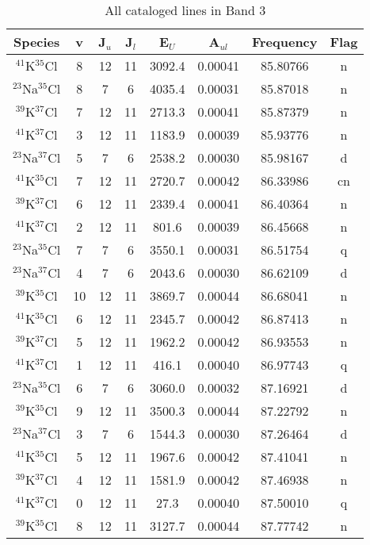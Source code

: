 \begin{table*}[htp]
\centering
\caption{All cataloged lines in Band 3}
\begin{tabular}{cccccccc}
\label{tab:all_detections_B3}
Species & v & J$_u$ & J$_l$ & E$_U$ & A$_{ul}$ & Frequency & Flag \\
\hline
$^{41}$K$^{35}$Cl & 8 & 12 & 11 & 3092.4 & 0.00041 & 85.80766 & n \\
$^{23}$Na$^{35}$Cl & 8 & 7 & 6 & 4035.4 & 0.00031 & 85.87018 & n \\
$^{39}$K$^{37}$Cl & 7 & 12 & 11 & 2713.3 & 0.00041 & 85.87379 & n \\
$^{41}$K$^{37}$Cl & 3 & 12 & 11 & 1183.9 & 0.00039 & 85.93776 & n \\
$^{23}$Na$^{37}$Cl & 5 & 7 & 6 & 2538.2 & 0.00030 & 85.98167 & d \\
$^{41}$K$^{35}$Cl & 7 & 12 & 11 & 2720.7 & 0.00042 & 86.33986 & cn \\
$^{39}$K$^{37}$Cl & 6 & 12 & 11 & 2339.4 & 0.00041 & 86.40364 & n \\
$^{41}$K$^{37}$Cl & 2 & 12 & 11 & 801.6 & 0.00039 & 86.45668 & n \\
$^{23}$Na$^{35}$Cl & 7 & 7 & 6 & 3550.1 & 0.00031 & 86.51754 & q \\
$^{23}$Na$^{37}$Cl & 4 & 7 & 6 & 2043.6 & 0.00030 & 86.62109 & d \\
$^{39}$K$^{35}$Cl & 10 & 12 & 11 & 3869.7 & 0.00044 & 86.68041 & n \\
$^{41}$K$^{35}$Cl & 6 & 12 & 11 & 2345.7 & 0.00042 & 86.87413 & n \\
$^{39}$K$^{37}$Cl & 5 & 12 & 11 & 1962.2 & 0.00042 & 86.93553 & n \\
$^{41}$K$^{37}$Cl & 1 & 12 & 11 & 416.1 & 0.00040 & 86.97743 & q \\
$^{23}$Na$^{35}$Cl & 6 & 7 & 6 & 3060.0 & 0.00032 & 87.16921 & d \\
$^{39}$K$^{35}$Cl & 9 & 12 & 11 & 3500.3 & 0.00044 & 87.22792 & n \\
$^{23}$Na$^{37}$Cl & 3 & 7 & 6 & 1544.3 & 0.00030 & 87.26464 & d \\
$^{41}$K$^{35}$Cl & 5 & 12 & 11 & 1967.6 & 0.00042 & 87.41041 & n \\
$^{39}$K$^{37}$Cl & 4 & 12 & 11 & 1581.9 & 0.00042 & 87.46938 & n \\
$^{41}$K$^{37}$Cl & 0 & 12 & 11 & 27.3 & 0.00040 & 87.50010 & q \\
$^{39}$K$^{35}$Cl & 8 & 12 & 11 & 3127.7 & 0.00044 & 87.77742 & n \\

\end{tabular}
\end{table*}
